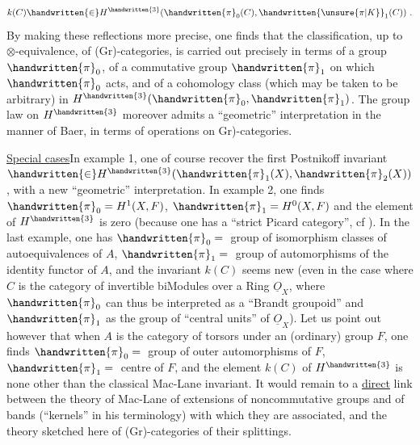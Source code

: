 \[
k(C)\handwritten{\in}H^{\handwritten{3}}(\handwritten{\pi}_{0}(C),\handwritten{\unsure{\pi|K}}_{1}(C))\ .
\]
By making these reflections more precise, one finds that the classification, up to $\otimes$-equivalence, of (Gr)-categories, is carried out precisely in terms of a group $\handwritten{\pi}_{0}$, of a commutative group $\handwritten{\pi}_{1}$ on which $\handwritten{\pi}_{0}$ acts, and of a cohomology class (which may be taken to be arbitrary) in $H^{\handwritten{3}}(\handwritten{\pi}_{0},\handwritten{\pi}_{1})$. The  group law on $H^{\handwritten{3}}$ moreover admits a ``geometric'' interpretation in the manner of Baer, in terms of operations on \handwritten{(}Gr)-categories.

\uline{Special cases}\quad In example 1, one  of course recover the first Postnikoff invariant $\handwritten{\in}H^{\handwritten{3}}(\handwritten{\pi}_{1}(X),\handwritten{\pi}_{2}(X))$, with a new ``geo\deleted{\unsure{(}}metric'' interpretation. In example 2, one finds $\handwritten{\pi}_{0}=H^{1}(X,F)$, $\handwritten{\pi}_{1}=H^{0}(X,F)$\handwritten{,} and the element of $H^{\handwritten{3}}$ is zero (because one has a ``strict Picard category'', cf \handwritten{[\, ]}). In  the last example, one has $\handwritten{\pi}_{0}={}$ group of isomorphism classes of autoequivalences of $A$, $\handwritten{\pi}_{1}={}$ group of automorphisms of the identity functor of $A$, and the invariant $k(C)$ seems new (even in the case where $C$ is the category of invertible biModules over a Ring $\underline{O}_{X}$, where $\handwritten{\pi}_{0}$ can thus be interpreted as a ``Brandt groupoid'' and $\handwritten{\pi}_{1}$ as the group of ``central units'' of $\underline{O}_{X}$). Let us point out however that when $A$ is the category of torsors under an (ordinary) group $F$, one finds  $\handwritten{\pi}_{0}={}$ group of outer automorphisms of $F$, $\handwritten{\pi}_{1}={}$ centre of $F$, and the element $k(C)$ of $H^{\handwritten{3}}$ is none other than the classical Mac-Lane invariant. It would remain to  a  \uline{direct} link between the theory of Mac-Lane of extensions of noncommutative groups and of bands (``kernels''\deleted{\unsure{)|,}} in his terminology) with which they are associated, and the theory  sketched here of (Gr)-categories  of their splittings.

